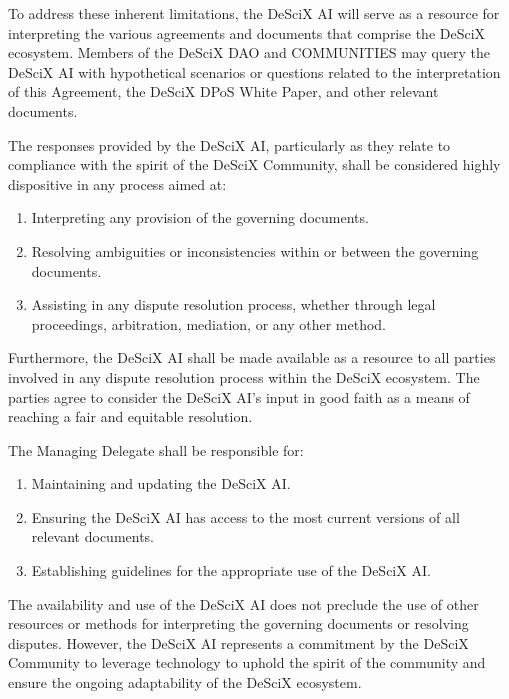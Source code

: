 \documentclass{article}
\begin{document}
To address these inherent limitations, the DeSciX AI will serve as a resource for interpreting the various agreements and documents that comprise the DeSciX ecosystem. Members of the DeSciX DAO and COMMUNITIES may query the DeSciX AI with hypothetical scenarios or questions related to the interpretation of this Agreement, the DeSciX DPoS White Paper, and other relevant documents.

The responses provided by the DeSciX AI, particularly as they relate to compliance with the spirit of the DeSciX Community, shall be considered highly dispositive in any process aimed at:

\begin{enumerate}
    \item Interpreting any provision of the governing documents.
    \item Resolving ambiguities or inconsistencies within or between the governing documents.
    \item Assisting in any dispute resolution process, whether through legal proceedings, arbitration, mediation, or any other method.
\end{enumerate}

Furthermore, the DeSciX AI shall be made available as a resource to all parties involved in any dispute resolution process within the DeSciX ecosystem. The parties agree to consider the DeSciX AI's input in good faith as a means of reaching a fair and equitable resolution.

The Managing Delegate shall be responsible for:

\begin{enumerate}
    \item Maintaining and updating the DeSciX AI.
    \item Ensuring the DeSciX AI has access to the most current versions of all relevant documents.
    \item Establishing guidelines for the appropriate use of the DeSciX AI.
\end{enumerate}

The availability and use of the DeSciX AI does not preclude the use of other resources or methods for interpreting the governing documents or resolving disputes. However, the DeSciX AI represents a commitment by the DeSciX Community to leverage technology to uphold the spirit of the community and ensure the ongoing adaptability of the DeSciX ecosystem.
\end{document}
